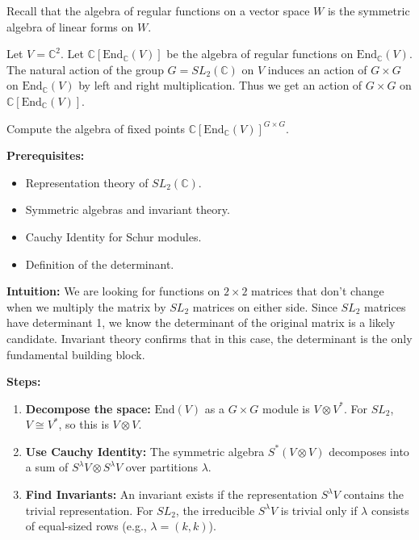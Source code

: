 \begin{exercise}
\label{algebra:2019:7}
Recall that the algebra of regular functions on a vector space $W$ is the symmetric algebra of linear forms on $W$.

Let $V = \mathbb{C}^2$. Let $\mathbb{C}[\mathrm{End}_{\mathbb{C}}(V)]$ be the algebra of regular functions on $\mathrm{End}_{\mathbb{C}}(V)$. The natural action of the group $G = SL_2(\mathbb{C})$ on $V$ induces an action of $G \times G$ on $\mathrm{End}_{\mathbb{C}}(V)$ by left and right multiplication. Thus we get an action of $G \times G$ on $\mathbb{C}[\mathrm{End}_{\mathbb{C}}(V)]$.

Compute the algebra of fixed points $\mathbb{C}[\mathrm{End}_{\mathbb{C}}(V)]^{G \times G}$.
\end{exercise}

\begin{solution}
\textbf{Prerequisites:}
\begin{itemize}
    \item Representation theory of $SL_2(\mathbb{C})$.
    \item Symmetric algebras and invariant theory.
    \item Cauchy Identity for Schur modules.
    \item Definition of the determinant.
\end{itemize}

\textbf{Intuition:}
We are looking for functions on $2 \times 2$ matrices that don't change when we multiply the matrix by $SL_2$ matrices on either side. Since $SL_2$ matrices have determinant 1, we know the determinant of the original matrix is a likely candidate. Invariant theory confirms that in this case, the determinant is the only fundamental building block.

\par

\textbf{Steps:}
\begin{enumerate}
    \item \textbf{Decompose the space:} $\mathrm{End}(V)$ as a $G \times G$ module is $V \otimes V^*$. For $SL_2$, $V \cong V^*$, so this is $V \otimes V$.

    \item \textbf{Use Cauchy Identity:} The symmetric algebra $S^*(V \otimes V)$ decomposes into a sum of $S^\lambda V \otimes S^\lambda V$ over partitions $\lambda$.

    \item \textbf{Find Invariants:} An invariant exists if the representation $S^\lambda V$ contains the trivial representation. For $SL_2$, the irreducible $S^\lambda V$ is trivial only if $\lambda$ consists of equal-sized rows (e.g., $\lambda = (k, k)$).


\end{enumerate}
\end{solution}
